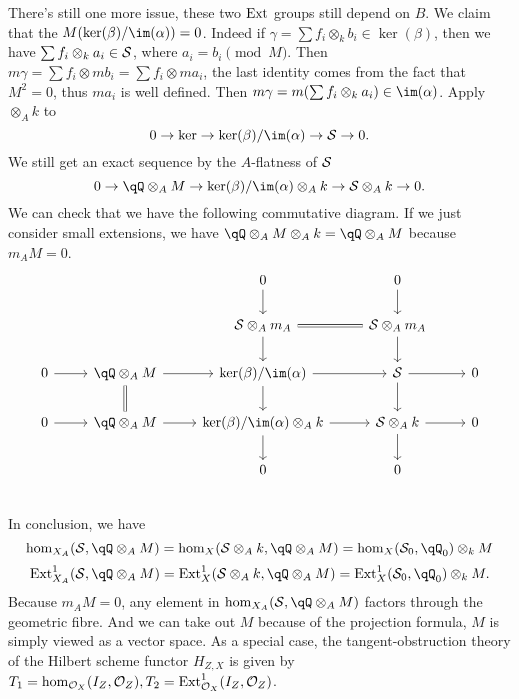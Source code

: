 \documentclass[../main.tex]{subfiles}
\begin{document}
There's still one more issue, these two $\ext$ groups still depend on $B$. We claim that  the $M(\ker(\beta)/\im(\alpha))=0$. Indeed if $\gamma=\sum f_{i}\otimes_{k}b_{i}\in \ker(\beta)$, then we have $\sum f_{i}\otimes_{k}a_{i}\in \S$, where $a_{i}=b_{i}\pmod M$. Then $m\gamma =\sum f_{i}\otimes mb_{i}=\sum f_{i}\otimes ma_{i}$, the last identity comes from the fact that $M^{2}=0$, thus $ma_{i}$ is well defined. Then $m\gamma=m(\sum f_{i}\otimes_{k}a_{i})\in \im(\alpha)$. 
Apply $\otimes_{A}k$ to 
$$0\rightarrow \ker\rightarrow \ker(\beta)/\im(\alpha)\rightarrow \S\rightarrow 0.$$
We still get an exact sequence by the $A$-flatness of $\S$
$$0\rightarrow \qQ\otimes_{A}M\rightarrow \ker(\beta)/\im(\alpha)\otimes_{A}k\rightarrow \S\otimes_{A}k\rightarrow 0.$$
We can check that we have the following commutative diagram. If we just consider small extensions, we have $\qQ\otimes_{A}M\otimes_{A}k=\qQ\otimes_{A}M$ because $m_{A}M=0$.
$$
\begin{tikzcd}
& & 0\arrow{d}& 0\arrow{d}&\\
 & & \S\otimes_{A}m_{A}\arrow{d}\arrow[r, equal]&  \S\otimes_{A}m_{A}\arrow{d}&\\
 0\arrow{r}&\qQ\otimes_{A}M \arrow{r}\arrow[d,equal]& \ker(\beta)/\im(\alpha)\arrow{r}\arrow{d}&  \S\arrow{d}\arrow{r}& 0\\
 0\arrow{r}&\qQ\otimes_{A}M \arrow{r}& \ker(\beta)/\im(\alpha)\otimes_{A}k\arrow{r}\arrow{d}&\S\otimes_{A}k \arrow{d}\arrow{r}&0\\
 & & 0& 0& \\
\end{tikzcd}
$$
In conclusion, we have
$$\hom_{X_{A}}(\S,\qQ\otimes_{A}M)=\hom_{X}(\S\otimes_{A}k,\qQ\otimes_{A}M)=\hom_{X}(\S_{0}, \qQ_{0})\otimes_{k}M$$
$$\ext^{1}_{X_{A}}(\S, \qQ\otimes_{A}M)=\ext^{1}_{X}(\S\otimes_{A}k, \qQ\otimes_{A}M)=\ext^{1}_{X}(\S_{0}, \qQ_{0})\otimes_{k} M.$$
Because $m_{A}M=0$, any element in $\hom_{X_{A}}(\S, \qQ\otimes_{A}M)$ factors through the geometric fibre. And we can take out $M$ because of the projection formula, $M$ is simply viewed as a vector space. As a special case, the tangent-obstruction theory of the Hilbert scheme functor $H_{Z,X}$ is given by $T_{1}=\hom_{\O_{X}}(I_{Z}, \O_{Z}), T_{2}=\ext^{1}_{\O_{X}}(I_{Z}, \O_{Z})$.
\end{document}
